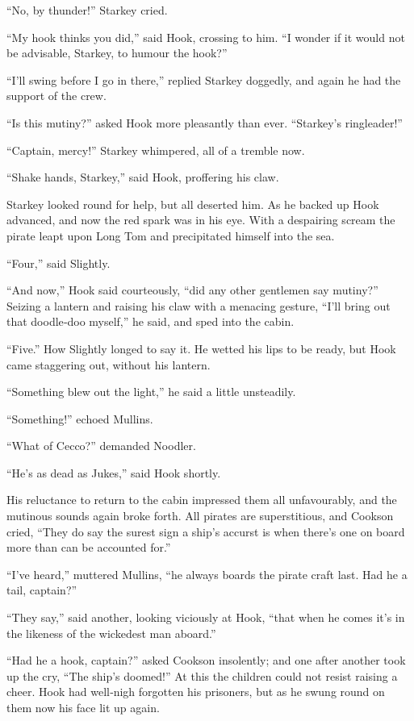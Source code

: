 “No, by thunder!\@” Starkey cried.

“My hook thinks you did,” said Hook, crossing to him.
“I wonder if it would not be advisable, Starkey, to humour the hook?”

“I’ll swing before I go in there,” replied Starkey doggedly,
and again he had the support of the crew.

“Is this mutiny?\@” asked Hook more pleasantly than ever.
“Starkey’s ringleader!”

“Captain, mercy!\@” Starkey whimpered, all of a tremble now.

“Shake hands, Starkey,” said Hook, proffering his claw.

Starkey looked round for help, but all deserted him.
As he backed up Hook advanced, and now the red spark was in his eye.
With a despairing scream the pirate leapt upon Long Tom and precipitated himself into the sea.

“Four,” said Slightly.

“And now,” Hook said courteously, “did any other gentlemen say mutiny?”
Seizing a lantern and raising his claw with a menacing gesture,
“I’ll bring out that doodle‐doo myself,” he said, and sped into the cabin.

“Five.”
How Slightly longed to say it.
He wetted his lips to be ready, but Hook came staggering out, without his lantern.

“Something blew out the light,” he said a little unsteadily.

“Something!\@” echoed Mullins.

“What of Cecco?\@” demanded Noodler.

“He’s as dead as Jukes,” said Hook shortly.

His reluctance to return to the cabin impressed them all unfavourably,
and the mutinous sounds again broke forth.
All pirates are superstitious, and Cookson cried,
“They do say the surest sign a ship’s accurst is when there’s one on board more than can be accounted for.”

“I’ve heard,” muttered Mullins, “he always boards the pirate craft last.
Had he a tail, captain?”

“They say,” said another, looking viciously at Hook,
“that when he comes it’s in the likeness of the wickedest man aboard.”

“Had he a hook, captain?\@” asked Cookson insolently;
and one after another took up the cry, “The ship’s doomed!”
At this the children could not resist raising a cheer.
Hook had well‐nigh forgotten his prisoners,
but as he swung round on them now his face lit up again.


